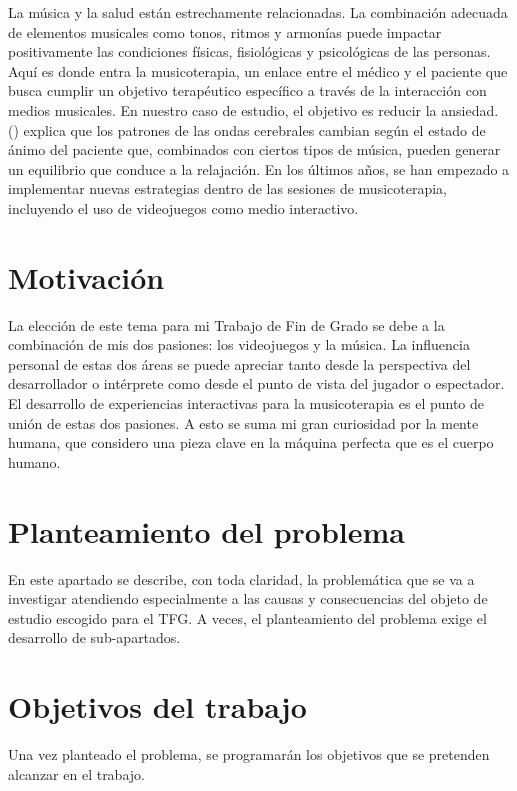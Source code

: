 La música y la salud están estrechamente relacionadas. La combinación adecuada de elementos musicales como tonos, ritmos y armonías puede impactar positivamente las condiciones físicas, fisiológicas y psicológicas de las personas. Aquí es donde entra la musicoterapia, un enlace entre el médico y el paciente que busca cumplir un objetivo terapéutico específico a través de la interacción con medios musicales. En nuestro caso de estudio, el objetivo es reducir la ansiedad. \citeauthor{KTN:2011} (\citeyear{KTN:2011}) explica que los patrones de las ondas cerebrales cambian según el estado de ánimo del paciente que, combinados con ciertos tipos de música, pueden generar un equilibrio que conduce a la relajación. En los últimos años, se han empezado a implementar nuevas estrategias dentro de las sesiones de musicoterapia, incluyendo el uso de videojuegos como medio interactivo.

\section{Motivación}

La elección de este tema para mi Trabajo de Fin de Grado se debe a la combinación de mis dos pasiones: los videojuegos y la música. La influencia personal de estas dos áreas se puede apreciar tanto desde la perspectiva del desarrollador o intérprete como desde el punto de vista del jugador o espectador. El desarrollo de experiencias interactivas para la musicoterapia es el punto de unión de estas dos pasiones. A esto se suma mi gran curiosidad por la mente humana, que considero una pieza clave en la máquina perfecta que es el cuerpo humano.

\section{Planteamiento del problema}

En este apartado se describe, con toda claridad, la problemática que se va a investigar atendiendo especialmente a las causas y consecuencias del objeto de estudio escogido para el TFG. A veces, el planteamiento del problema exige el desarrollo de sub-apartados.

\section{Objetivos del trabajo}

Una vez planteado el problema, se programarán los objetivos que se pretenden alcanzar en el trabajo.